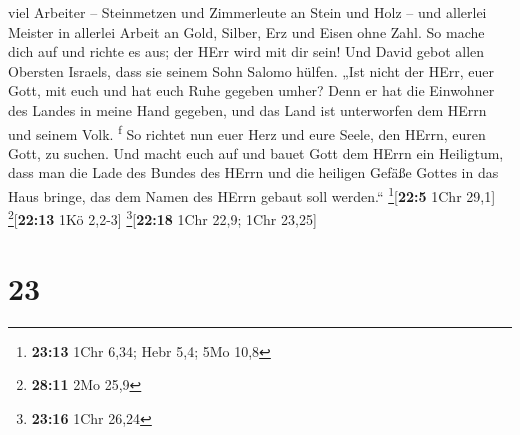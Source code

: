 viel Arbeiter -- Steinmetzen und Zimmerleute an Stein und Holz -- und
allerlei Meister in allerlei Arbeit  an Gold, Silber, Erz
und Eisen ohne Zahl. So mache dich auf und richte es aus; der HErr wird
mit dir sein!  Und David gebot allen Obersten Israels,
dass sie seinem Sohn Salomo hülfen.  „Ist nicht der HErr,
euer Gott, mit euch und hat euch Ruhe gegeben umher? Denn er hat die
Einwohner des Landes in meine Hand gegeben, und das Land ist unterworfen
dem HErrn und seinem Volk. \textsuperscript{f}  So
richtet nun euer Herz und eure Seele, den HErrn, euren Gott, zu suchen.
Und macht euch auf und bauet Gott dem HErrn ein Heiligtum, dass man die
Lade des Bundes des HErrn und die heiligen Gefäße Gottes in das Haus
bringe, das dem Namen des HErrn gebaut soll werden.``
\footnote{\textbf{23:13} 1Chr 6,34; Hebr 5,4; 5Mo 10,8}{[}\textbf{22:5}
1Chr 29,1{]} \footnote{\textbf{28:11} 2Mo 25,9}{[}\textbf{22:13} 1Kö
2,2-3{]} \footnote{\textbf{23:16} 1Chr 26,24}{[}\textbf{22:18} 1Chr
22,9; 1Chr 23,25{]}

\hypertarget{section-22}{%
\section{23}\label{section-22}}

